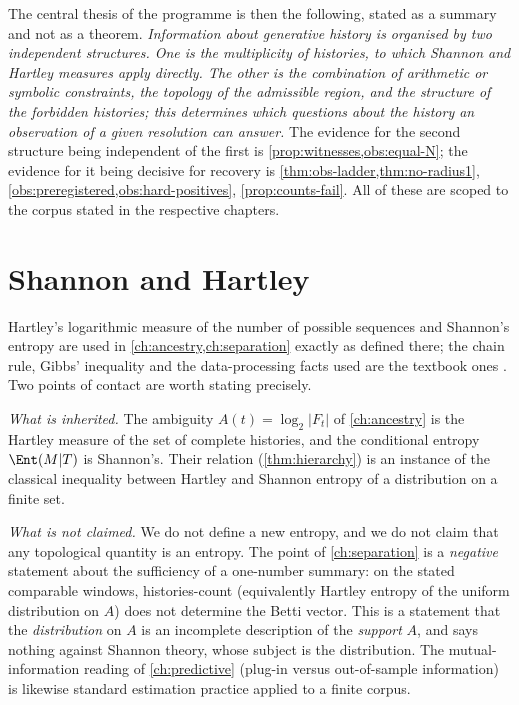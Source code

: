 The central thesis of the programme is then the following, stated as a summary and not as a theorem. \emph{Information about generative history is organised by two independent structures. One is the multiplicity of histories, to which Shannon and Hartley measures apply directly. The other is the combination of arithmetic or symbolic constraints, the topology of the admissible region, and the structure of the forbidden histories; this determines which questions about the history an observation of a given resolution can answer.} The evidence for the second structure being independent of the first is \cref{prop:witnesses,obs:equal-N}; the evidence for it being decisive for recovery is \cref{thm:obs-ladder,thm:no-radius1}, \cref{obs:preregistered,obs:hard-positives}, \cref{prop:counts-fail}. All of these are scoped to the corpus stated in the respective chapters.

\section{Shannon and Hartley}\label{sec:shannon}
Hartley's logarithmic measure of the number of possible sequences \cite{Hartley28} and Shannon's entropy \cite{Shannon48} are used in \cref{ch:ancestry,ch:separation} exactly as defined there; the chain rule, Gibbs' inequality and the data-processing facts used are the textbook ones \cite{CoverThomas}. Two points of contact are worth stating precisely.

\emph{What is inherited.} The ambiguity $A(t)=\log_2|F_t|$ of \cref{ch:ancestry} is the Hartley measure of the set of complete histories, and the conditional entropy $\Ent(M|T)$ is Shannon's. Their relation (\cref{thm:hierarchy}) is an instance of the classical inequality between Hartley and Shannon entropy of a distribution on a finite set.

\emph{What is not claimed.} We do not define a new entropy, and we do not claim that any topological quantity is an entropy. The point of \cref{ch:separation} is a \emph{negative} statement about the sufficiency of a one-number summary: on the stated comparable windows, histories-count (equivalently Hartley entropy of the uniform distribution on $A$) does not determine the Betti vector. This is a statement that the \emph{distribution} on $A$ is an incomplete description of the \emph{support} $A$, and says nothing against Shannon theory, whose subject is the distribution. The mutual-information reading of \cref{ch:predictive} (plug-in versus out-of-sample information) is likewise standard estimation practice applied to a finite corpus.

